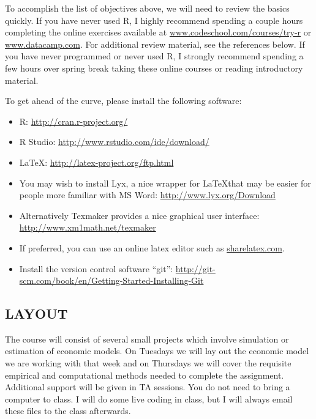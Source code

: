 \documentclass{scrartcl}
\begin{document}
To accomplish the list of objectives above, we will need to review the basics quickly. If you have never used R, I highly recommend spending a couple hours completing the online exercises available at \href{www.codeschool.com/courses/try-r}{www.codeschool.com/courses/try-r} or  \href{www.datacamp.com}{www.datacamp.com}. For additional review material, see the references below. If you have never programmed or never used R, I strongly recommend spending a few hours over spring break taking these online courses or reading introductory material. 

To get ahead of the curve, please install the following software:
\begin{itemize}
\item R: \href{http://cran.r-project.org/}{http://cran.r-project.org/}
\item R Studio: \href{http://www.rstudio.com/ide/download/}{http://www.rstudio.com/ide/download/}
\item \LaTeX: \href{http://latex-project.org/ftp.html}{http://latex-project.org/ftp.html}
\item You may wish to install Lyx, a nice wrapper for \LaTeX that may be easier for people more familiar with MS Word: \href{http://www.lyx.org/Download}{http://www.lyx.org/Download}
\item Alternatively Texmaker provides a nice graphical user interface: \href{http://www.xm1math.net/texmaker}{http://www.xm1math.net/texmaker}
\item If preferred, you can use an online latex editor such as \href{sharelatex.com}{sharelatex.com}.
\item Install the version control software ``git'': \href{http://git-scm.com/book/en/Getting-Started-Installing-Git}{http://git-scm.com/book/en/Getting-Started-Installing-Git}
\end{itemize}

\subsection*{LAYOUT}

The course will consist of several small projects which involve simulation or estimation of economic models. On Tuesdays we will lay out the economic model we are working with that week and on Thursdays we will cover the requisite empirical and computational methods needed to complete the assignment. Additional support will be given in TA sessions. You do not need to bring a computer to class. I will do some live coding in class, but I will always email these files to the class afterwards. 
\end{document}
